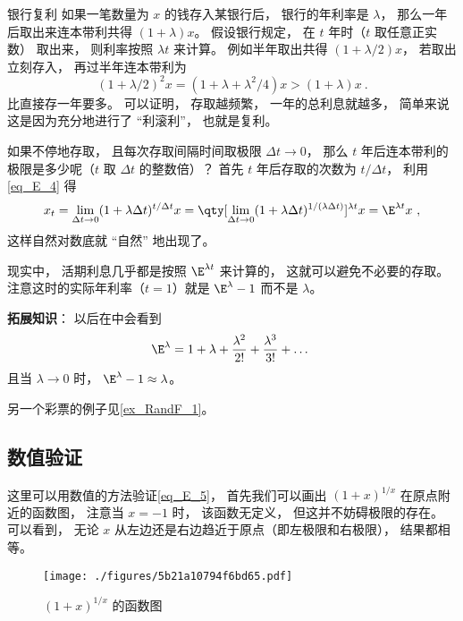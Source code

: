 \begin{example}{银行复利}
如果一笔数量为 $x$ 的钱存入某银行后， 银行的年利率是 $\lambda$， 那么一年后取出来连本带利共得 $(1+\lambda)x$。 假设银行规定， 在 $t$ 年时（$t$ 取任意正实数） 取出来， 则利率按照 $\lambda t$ 来计算。 例如半年取出共得 $(1+\lambda/2)x$， 若取出立刻存入， 再过半年连本带利为
\begin{equation}
(1+\lambda/2)^2 x = (1 + \lambda + \lambda^2/4)x > (1 + \lambda) x~.
\end{equation}
比直接存一年要多。 可以证明， 存取越频繁， 一年的总利息就越多， 简单来说这是因为充分地进行了 “利滚利”， 也就是复利。

如果不停地存取， 且每次存取间隔时间取极限 $\Delta t \to 0$， 那么 $t$ 年后连本带利的极限是多少呢（$t$ 取 $\Delta t$ 的整数倍）？ 首先 $t$ 年后存取的次数为 $t/\Delta t$， 利用\autoref{eq_E_4} 得
\begin{equation}
x_t = \lim_{\Delta t\to 0}(1 + \lambda \Delta t)^{t/\Delta t} x
= \qty[\lim_{\Delta t\to 0}(1 + \lambda \Delta t)^{1/(\lambda \Delta t)}]^{\lambda t} x
= \E^{\lambda t} x~,
\end{equation}
这样自然对数底就 “自然” 地出现了。

现实中， 活期利息几乎都是按照 $\E^{\lambda t}$ 来计算的， 这就可以避免不必要的存取。 注意这时的实际年利率（$t = 1$）就是 $\E^\lambda - 1$ 而不是 $\lambda$。

\textbf{拓展知识}： 以后在中会看到
\begin{equation}
\E^\lambda = 1 + \lambda + \frac{\lambda^2}{2!} + \frac{\lambda^3}{3!} + \dots~
\end{equation}
且当 $\lambda\to 0$ 时， $\E^\lambda - 1 \approx \lambda$。
\end{example}

另一个彩票的例子见\autoref{ex_RandF_1}。

\subsection{数值验证}\label{sub_E_1}
这里可以用数值的方法验证\autoref{eq_E_5}， 首先我们可以画出 $(1+x)^{1/x}$ 在原点附近的函数图， 注意当 $x = -1$ 时， 该函数无定义， 但这并不妨碍极限的存在。 可以看到， 无论 $x$ 从左边还是右边趋近于原点（即左极限和右极限）， 结果都相等。
\begin{figure}[ht]
\centering
\texttt{[image: ./figures/5b21a10794f6bd65.pdf]}
\caption{$(1+x)^{1/x}$ 的函数图} \label{fig_E_1}
\end{figure}

